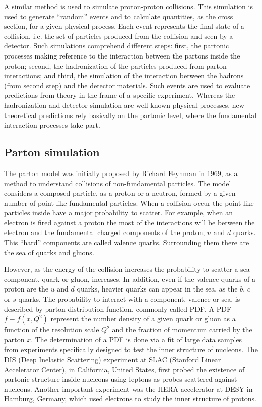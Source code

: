 A similar method is used to simulate proton-proton collisions. This simulation is used to generate ``random'' events and to calculate quantities, as the cross section, for a given physical process. Each event represents the final state of a collision, i.e. the set of particles produced from the collision and seen by a detector. Such simulations comprehend different steps: first, the partonic processes making reference to the interaction between the partons inside the proton; second, the hadronization of the particles produced from parton interactions; and third, the simulation of the interaction between the hadrons (from second step) and the detector materials. Such events are used to evaluate predictions from theory in the frame of a specific experiment. Whereas the hadronization and detector simulation are well-known physical processes, new theoretical predictions rely basically on the partonic level, where the fundamental interaction processes take part.

\subsection{Parton simulation}
\label{sec:parton}

The parton model was initially proposed by Richard Feynman in 1969, as a method to understand collisions of non-fundamental particles. The model considers a composed particle, as a proton or a neutron, formed by a given number of point-like fundamental particles. When a collision occur the point-like particles inside have a major probability to scatter. For example, when an electron is fired against a proton the most of the interactions will be between the electron and the fundamental charged components of the proton, $u$ and $d$ quarks. This ``hard'' components are called valence quarks. Surrounding them there are the sea of quarks and gluons.

However, as the energy of the collision increases the probability to scatter a sea component, quark or gluon, increases. In addition, even if the valence quarks of a proton are the $u$ and $d$ quarks, heavier quarks can appear in the sea, as the $b$, $c$ or $s$ quarks. The probability to interact with a component, valence or sea, is described by parton distribution function, commonly called PDF. A PDF $f\equiv f(x,Q^{2})$ represent the number density of a given quark or gluon as a function of the resolution scale $Q^{2}$ and the fraction of momentum carried by the parton $x$. The determination of a PDF is done via a fit of large data samples from experiments specifically designed to test the inner structure of nucleons. The DIS (Deep Inelastic Scattering) experiment at SLAC (Stanford Linear Accelerator Center), in California, United States, first probed the existence of partonic structure inside nucleons using leptons as probes scattered against nucleons. Another important experiment was the HERA accelerator at DESY in Hamburg, Germany, which used electrons to study the inner structure of protons.

